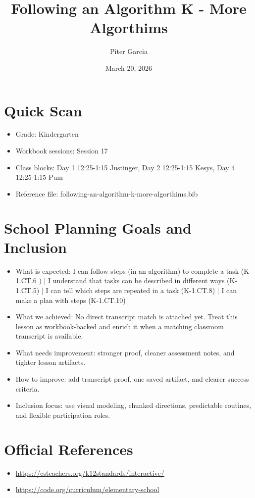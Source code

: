 \documentclass[11pt]{article}
\title{Following an Algorithm K - More Algorthims}
\author{Piter Garcia}
\date{March 20, 2026}
\begin{document}
    \maketitle
    \section*{Quick Scan}
    \begin{itemize}[leftmargin=*]
    \item Grade: Kindergarten
    \item Workbook sessions: Session 17
    \item Class blocks: Day 1 12:25-1:15 Justinger, Day 2 12:25-1:15 Kesys, Day 4 12:25-1:15 Pum
    \item Reference file: following-an-algorithm-k-more-algorthims.bib
    \end{itemize}
    \section*{School Planning Goals and Inclusion}
    \begin{itemize}[leftmargin=*]
    \item What is expected: I can follow steps (in an algorithm) to complete a task (K-1.CT.6 ) | I understand that tasks can be described in different ways (K-1.CT.5) | I can tell which steps are repeated in a task (K-1.CT.8) | I can make a plan with steps (K-1.CT.10)
    \item What we achieved: No direct transcript match is attached yet. Treat this lesson as workbook-backed and enrich it when a matching classroom transcript is available.
    \item What needs improvement: stronger proof, cleaner assessment notes, and tighter lesson artifacts.
    \item How to improve: add transcript proof, one saved artifact, and clearer success criteria.
    \item Inclusion focus: use visual modeling, chunked directions, predictable routines, and flexible participation roles.
    \end{itemize}
    \section*{Official References}
    \begin{itemize}[leftmargin=*]
    \item \url{https://csteachers.org/k12standards/interactive/}
\item \url{https://code.org/curriculum/elementary-school}

    \end{itemize}
    
\end{document}

